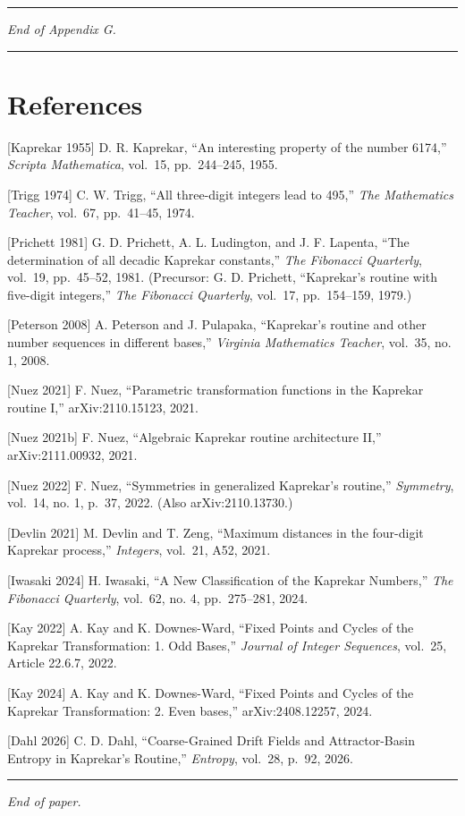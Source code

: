 \documentclass[11pt,letterpaper]{article}
\theoremstyle{paperstyle}
\theoremstyle{paperstyledef}
\theoremstyle{paperstylerem}
\begin{document}
\begin{center}\rule{0.5\linewidth}{0.5pt}\end{center}

\emph{End of Appendix G.}

\begin{center}\rule{0.5\linewidth}{0.5pt}\end{center}

\hypertarget{references}{%
\section{References}\label{references}}

{[}Kaprekar 1955{]} D. R. Kaprekar, ``An interesting property of the
number 6174,'' \emph{Scripta Mathematica}, vol.~15, pp.~244--245, 1955.

{[}Trigg 1974{]} C. W. Trigg, ``All three-digit integers lead to 495,''
\emph{The Mathematics Teacher}, vol.~67, pp.~41--45, 1974.

{[}Prichett 1981{]} G. D. Prichett, A. L. Ludington, and J. F. Lapenta,
``The determination of all decadic Kaprekar constants,'' \emph{The
Fibonacci Quarterly}, vol.~19, pp.~45--52, 1981. (Precursor: G. D.
Prichett, ``Kaprekar's routine with five-digit integers,'' \emph{The
Fibonacci Quarterly}, vol.~17, pp.~154--159, 1979.)

{[}Peterson 2008{]} A. Peterson and J. Pulapaka, ``Kaprekar's routine
and other number sequences in different bases,'' \emph{Virginia
Mathematics Teacher}, vol.~35, no. 1, 2008.

{[}Nuez 2021{]} F. Nuez, ``Parametric transformation functions in the
Kaprekar routine I,'' arXiv:2110.15123, 2021.

{[}Nuez 2021b{]} F. Nuez, ``Algebraic Kaprekar routine architecture
II,'' arXiv:2111.00932, 2021.

{[}Nuez 2022{]} F. Nuez, ``Symmetries in generalized Kaprekar's
routine,'' \emph{Symmetry}, vol.~14, no. 1, p.~37, 2022. (Also
arXiv:2110.13730.)

{[}Devlin 2021{]} M. Devlin and T. Zeng, ``Maximum distances in the
four-digit Kaprekar process,'' \emph{Integers}, vol.~21, A52, 2021.

{[}Iwasaki 2024{]} H. Iwasaki, ``A New Classification of the Kaprekar
Numbers,'' \emph{The Fibonacci Quarterly}, vol.~62, no. 4, pp.~275--281,
2024.

{[}Kay 2022{]} A. Kay and K. Downes-Ward, ``Fixed Points and Cycles of
the Kaprekar Transformation: 1. Odd Bases,'' \emph{Journal of Integer
Sequences}, vol.~25, Article 22.6.7, 2022.

{[}Kay 2024{]} A. Kay and K. Downes-Ward, ``Fixed Points and Cycles of
the Kaprekar Transformation: 2. Even bases,'' arXiv:2408.12257, 2024.

{[}Dahl 2026{]} C. D. Dahl, ``Coarse-Grained Drift Fields and
Attractor-Basin Entropy in Kaprekar's Routine,'' \emph{Entropy},
vol.~28, p.~92, 2026.

\begin{center}\rule{0.5\linewidth}{0.5pt}\end{center}

\emph{End of paper.}
\end{document}
